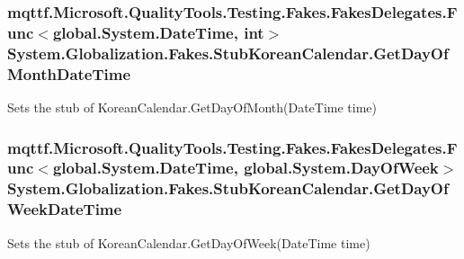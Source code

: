 \hypertarget{class_system_1_1_globalization_1_1_fakes_1_1_stub_korean_calendar_a6224f223719dad9e4789a540d79a608a}{
\subsubsection[{Get\-Day\-Of\-Month\-Date\-Time}]{\setlength{\rightskip}{0pt plus 5cm}mqttf.\-Microsoft.\-Quality\-Tools.\-Testing.\-Fakes.\-Fakes\-Delegates.\-Func$<$global.\-System.\-Date\-Time, int$>$ System.\-Globalization.\-Fakes.\-Stub\-Korean\-Calendar.\-Get\-Day\-Of\-Month\-Date\-Time}}\label{class_system_1_1_globalization_1_1_fakes_1_1_stub_korean_calendar_a6224f223719dad9e4789a540d79a608a}


Sets the stub of Korean\-Calendar.\-Get\-Day\-Of\-Month(\-Date\-Time time)

\hypertarget{class_system_1_1_globalization_1_1_fakes_1_1_stub_korean_calendar_a5850284cfc6cea0125cf53ebf61c9d9f}{
\subsubsection[{Get\-Day\-Of\-Week\-Date\-Time}]{\setlength{\rightskip}{0pt plus 5cm}mqttf.\-Microsoft.\-Quality\-Tools.\-Testing.\-Fakes.\-Fakes\-Delegates.\-Func$<$global.\-System.\-Date\-Time, global.\-System.\-Day\-Of\-Week$>$ System.\-Globalization.\-Fakes.\-Stub\-Korean\-Calendar.\-Get\-Day\-Of\-Week\-Date\-Time}}\label{class_system_1_1_globalization_1_1_fakes_1_1_stub_korean_calendar_a5850284cfc6cea0125cf53ebf61c9d9f}


Sets the stub of Korean\-Calendar.\-Get\-Day\-Of\-Week(\-Date\-Time time)

